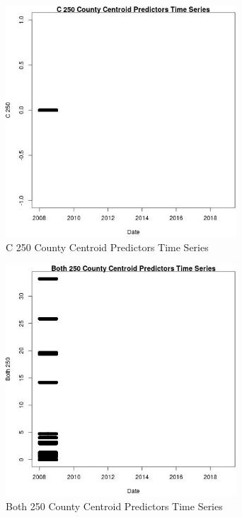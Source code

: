 \begin{figure} 
\centering  
\includegraphics[width=0.77\textwidth]{Code_Outputs/df_report_ML_predictors_CountyCentroid_Locations_Dates_2008-01-01to2018-12-31_C_250vDate.jpg} 
\caption{\label{fig:df_report_ML_predictors_CountyCentroid_Locations_Dates_2008-01-01to2018-12-31C_250vDate}C 250 County Centroid Predictors Time Series} 
\end{figure} 
 

\begin{figure} 
\centering  
\includegraphics[width=0.77\textwidth]{Code_Outputs/df_report_ML_predictors_CountyCentroid_Locations_Dates_2008-01-01to2018-12-31_Both_250vDate.jpg} 
\caption{\label{fig:df_report_ML_predictors_CountyCentroid_Locations_Dates_2008-01-01to2018-12-31Both_250vDate}Both 250 County Centroid Predictors Time Series} 
\end{figure} 
 

